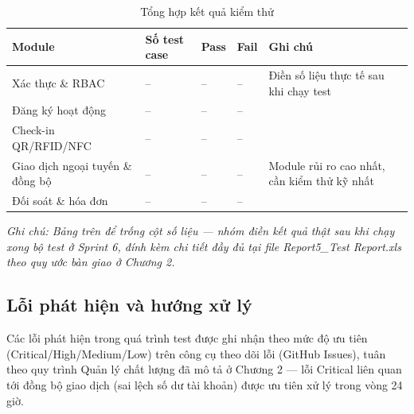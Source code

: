 \begin{table}[htbp]
    \centering
    \small
    \caption{Tổng hợp kết quả kiểm thử}
    \begin{tabular}{|p{3.5cm}|p{2cm}|p{2cm}|p{2cm}|p{4cm}|}
        \hline
        \textbf{Module} & \textbf{Số test case} & \textbf{Pass} & \textbf{Fail} & \textbf{Ghi chú} \\
        \hline
        Xác thực \& RBAC & -- & -- & -- & Điền số liệu thực tế sau khi
        chạy test \\
        \hline
        Đăng ký hoạt động & -- & -- & -- & \\
        \hline
        Check-in QR/RFID/NFC & -- & -- & -- & \\
        \hline
        Giao dịch ngoại tuyến \& đồng bộ & -- & -- & -- & Module rủi ro
        cao nhất, cần kiểm thử kỹ nhất \\
        \hline
        Đối soát \& hóa đơn & -- & -- & -- & \\
        \hline
    \end{tabular}
\end{table}

\textit{Ghi chú: Bảng trên để trống cột số liệu — nhóm điền kết quả thật
sau khi chạy xong bộ test ở Sprint 6, đính kèm chi tiết đầy đủ tại file
Report5\_Test Report.xls theo quy ước bàn giao ở Chương 2.}

\subsection{Lỗi phát hiện và hướng xử lý}
Các lỗi phát hiện trong quá trình test được ghi nhận theo mức độ ưu tiên
(Critical/High/Medium/Low) trên công cụ theo dõi lỗi (GitHub Issues),
tuân theo quy trình Quản lý chất lượng đã mô tả ở Chương 2 — lỗi Critical
liên quan tới đồng bộ giao dịch (sai lệch số dư tài khoản) được ưu tiên
xử lý trong vòng 24 giờ.